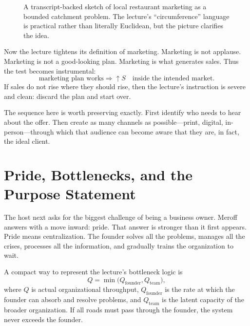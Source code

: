 \begin{figure}[h]
\centering
{}
\caption{A transcript-backed sketch of local restaurant marketing as a bounded catchment problem. The lecture's ``circumference'' language is practical rather than literally Euclidean, but the picture clarifies the idea.}
\end{figure}

Now the lecture tightens its definition of marketing. Marketing is not applause. Marketing is not a good-looking plan. Marketing is what generates sales. Thus the test becomes instrumental:
\[
\text{marketing plan works}
\Rightarrow
\uparrow S
\quad \text{inside the intended market.}
\]
If sales do not rise where they should rise, then the lecture's instruction is severe and clean: discard the plan and start over.

The sequence here is worth preserving exactly. First identify who needs to hear about the offer. Then create as many channels as possible---print, digital, in-person---through which that audience can become aware that they are, in fact, the ideal client.

\section{Pride, Bottlenecks, and the Purpose Statement}

The host next asks for the biggest challenge of being a business owner. Meroff answers with a move inward: pride. That answer is stronger than it first appears. Pride means centralization. The founder solves all the problems, manages all the crises, processes all the information, and gradually trains the organization to wait.

A compact way to represent the lecture's bottleneck logic is
\begin{equation}
Q = \min\!\bigl(Q_{\text{founder}},Q_{\text{team}}\bigr),
\end{equation}
where $Q$ is actual organizational throughput, $Q_{\text{founder}}$ is the rate at which the founder can absorb and resolve problems, and $Q_{\text{team}}$ is the latent capacity of the broader organization. If all roads must pass through the founder, the system never exceeds the founder.

